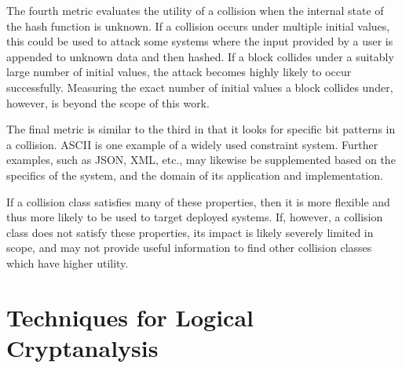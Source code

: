 \documentclass[conference]{IEEEtran}
\begin{document}
The fourth metric evaluates the utility of a collision when the internal state
of the hash function is unknown. If a collision occurs under multiple initial
values, this could be used to attack some systems where the input
provided by a user is
appended to unknown data and then hashed. If a block collides under a suitably
large number of initial values, the attack becomes highly likely to occur
successfully. Measuring the exact number of initial values a block
collides under, however, is beyond the scope of this work.

The final metric is similar to the third in that it looks for specific bit
patterns in a collision. ASCII is one example of a widely used constraint
system. Further examples, such as JSON, XML, etc., may likewise be
supplemented based on the specifics of the system, and the domain of
its application and implementation.

If a collision class satisfies many of these properties, then it is more
flexible and thus more likely to be used to target deployed systems. If,
however, a collision class does not satisfy these properties, its impact is
likely severely limited in scope, and may not provide useful information to
find other collision classes which have higher utility.

\section{Techniques for Logical Cryptanalysis} \label{Sec:Logical}
\end{document}
